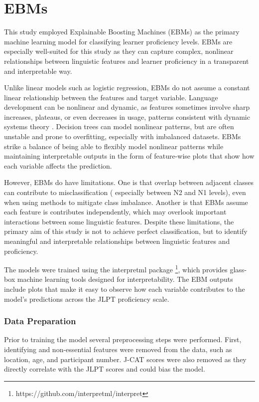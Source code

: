 \section{EBMs}
This study employed Explainable Boosting Machines (EBMs) \citep{nori2019} as the primary machine learning model for
classifying learner proficiency levels. EBMs are especially well-suited for this study as they can capture complex,
nonlinear relationships between linguistic features and learner proficiency in a transparent and interpretable way.

Unlike linear models such as logistic regression, EBMs do not assume a constant linear relationship
between the features and target variable. Language development can be nonlinear and dynamic, as features
sometimes involve sharp increases, plateaus, or even decreases in usage, patterns consistent with dynamic
systems
theory \citet{
Debot2007}. Decision trees can model nonlinear patterns, but are often unstable and
prone to
overfitting, especially with imbalanced
datasets. EBMs strike a balance of being able to flexibly model nonlinear patterns while maintaining interpretable
outputs in the form of feature-wise plots that show how each variable affects the prediction.

However, EBMs do have limitations. One is that overlap between adjacent classes can contribute to misclassification (
especially
between N2 and N1 levels), even when using methods to mitigate class imbalance. Another is that EBMs assume each
feature is contributes independently, which may overlook important interactions between some linguistic features.
Despite
these limitations, the primary aim of this study is not to achieve perfect
classification, but to identify meaningful and interpretable relationships between linguistic
features and
proficiency.

The models were trained using the interpretml package \footnote{https://github.com/interpretml/interpret}, which
provides glass-box machine learning tools designed for interpretability. The EBM outputs include plots that make it
easy to observe how each variable contributes to the model's predictions across the JLPT proficiency scale.


\subsubsection{Data Preparation}
Prior to training the model several preprocessing steps were performed. First, identifying and non-essential
features were removed from the data, such as location, age, and participant number. J-CAT scores were also removed as
they
directly correlate with the JLPT scores and could bias the model.

